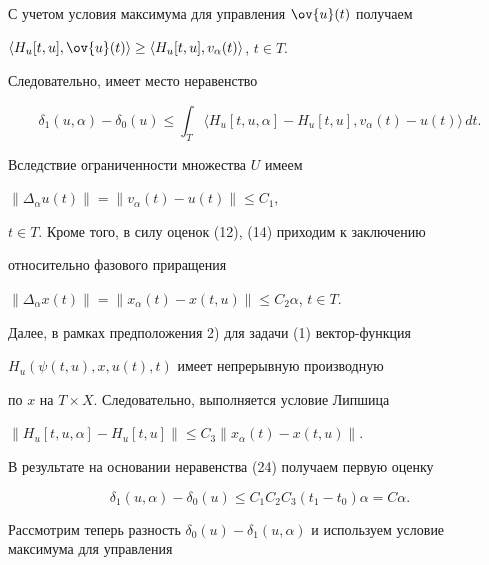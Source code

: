 С учетом условия максимума для управления $\ov{u}(t)$ получаем


$\langle H_{u}[t, u], \ov{u}(t)\rangle \geq


\langle H_{u}[t, u], v_{\alpha}(t)\rangle$, $t \in T$.


Следовательно, имеет место неравенство


\begin{equation}


\delta_{1}(u, \alpha) - \delta_{0}(u) \leq \int_{T}


\langle H_{u}[t, u, \alpha] - H_{u}[t, u], v_{\alpha}(t) -


u(t)\rangle\,dt.


\end{equation}


Вследствие ограниченности множества $U$ имеем


$\| \Delta_{\alpha} u(t)\| = \| v_{\alpha}(t) - u(t)\| \leq C_{1}$,


$t \in T$. Кроме того, в силу оценок (12), (14) приходим к заключению


относительно фазового приращения


$\| \Delta_{\alpha} x(t)\| =


\| x_{\alpha}(t) - x(t, u)\| \leq C_{2} \alpha$, $t \in T$.


Далее, в рамках предположения 2) для задачи (1) вектор-функция


$H_{u}(\psi(t, u), x, u(t), t)$ имеет непрерывную производную


по $x$ на $T \times X$. Следовательно, выполняется условие Липшица


$\| H_{u}[t, u, \alpha] - H_{u}[t, u]\| \leq C_{3}


\| x_{\alpha}(t) - x(t, u)\|$.


В результате на основании неравенства (24) получаем первую оценку


\begin{equation}


\delta_{1}(u, \alpha) - \delta_{0}(u) \leq C_{1} C_{2}


C_{3}(t_{1} - t_{0})\alpha = C \alpha.


\end{equation}





Рассмотрим теперь разность $\delta_{0}(u) - \delta_{1}(u,


\alpha)$ и используем условие максимума для управления


